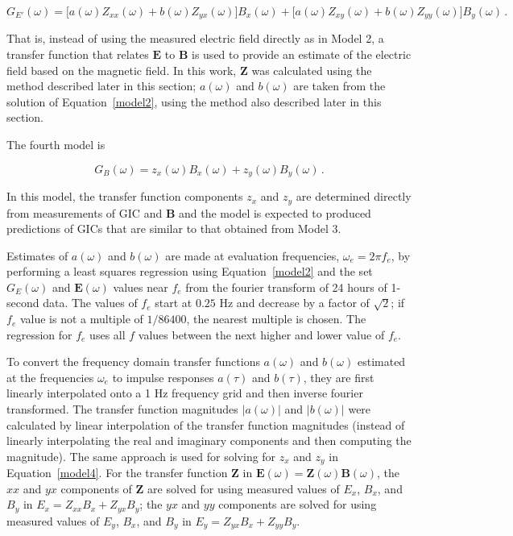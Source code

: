 \documentclass[draft,linenumbers]{agujournal2018}
\begin{document}
\begin{equation*}
G_{E'}(\omega) = \big[a(\omega)Z_{xx}(\omega) + b(\omega)Z_{yx}(\omega) \big] B_x(\omega) + \big[ a(\omega)Z_{xy}(\omega) + b(\omega)Z_{yy}(\omega) \big] B_y(\omega)\,.
\end{equation*}

That is, instead of using the measured electric field directly as in Model 2, a transfer function that relates $\mathbf{E}$ to $\mathbf{B}$ is used to provide an estimate of the electric field based on the magnetic field. In this work, $\boldsymbol{Z}$ was calculated using the method described later in this section; $a(\omega)$ and $b(\omega)$ are taken from the solution of Equation~\ref{model2}, using the method also described later in this section.

The fourth model is

\begin{linenomath*}
\begin{equation}
G_B(\omega) = z_x(\omega)B_x(\omega) + z_y(\omega)B_y(\omega)\,.
\label{model4}
\end{equation}
\end{linenomath*}

\noindent
In this model, the transfer function components $z_x$ and $z_y$ are determined directly from measurements of GIC and $\mathbf{B}$ and the model is expected to produced predictions of GICs that are similar to that obtained from Model 3.

Estimates of $a(\omega)$ and $b(\omega)$ are made at evaluation frequencies, $\omega_e = 2\pi f_e$, by performing a least squares regression using Equation~\ref{model2} and the set $G_E(\omega)$ and $\mathbf{E}(\omega)$ values near $f_e$ from the fourier transform of 24 hours of 1-second data. The values of $f_e$ start at $0.25$ Hz and decrease by a factor of $\sqrt{2}$; if $f_e$ value is not a multiple of $1/86400$, the nearest multiple is chosen. The regression for $f_e$ uses all $f$ values between the next higher and lower value of $f_e$.

To convert the frequency domain transfer functions $a(\omega)$ and $b(\omega)$ estimated at the frequencies $\omega_e$ to impulse responses $a(\tau)$ and $b(\tau)$, they are first linearly interpolated onto a 1 Hz frequency grid and then inverse fourier transformed. The transfer function magnitudes $|a(\omega)|$ and $|b(\omega)|$ were calculated by linear interpolation of the transfer function magnitudes (instead of linearly interpolating the real and imaginary components and then computing the magnitude). The same approach is used for solving for $z_x$ and $z_y$ in Equation~\ref{model4}. For the transfer function $\boldsymbol{Z}$ in $\mathbf{E}(\omega) = \boldsymbol{Z}(\omega)\mathbf{B}(\omega)$, the $xx$ and $yx$ components of $\boldsymbol{Z}$ are solved for using measured values of $E_x$, $B_x$, and $B_y$ in $E_x = Z_{xx}B_x + Z_{yx}B_{y}$; the $yx$ and $yy$ components are solved for using measured values of $E_y$, $B_x$, and $B_y$ in $E_y = Z_{yx}B_x + Z_{yy}B_y$.
\end{document}
